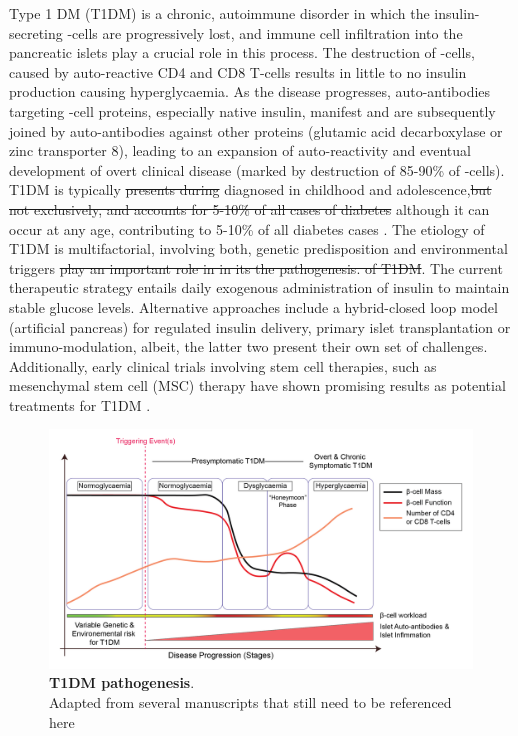Type 1 DM (T1DM) is a chronic, autoimmune disorder in which the insulin-secreting \textbeta-cells are progressively lost, and immune cell infiltration into the pancreatic islets play a crucial role in this process. The destruction of \textbeta-cells, caused by auto-reactive CD4 and CD8 T-cells results in little to no insulin production causing hyperglycaemia. As the disease progresses, auto-antibodies targeting \textbeta-cell proteins, especially native insulin, manifest and are subsequently joined by auto-antibodies against other proteins (glutamic acid decarboxylase or zinc transporter 8), leading to an expansion of auto-reactivity and eventual development of overt clinical disease (marked by destruction of 85-90\% of \textbeta-cells).
\newpage
T1DM is typically \st{presents during} diagnosed in childhood and adolescence,\st{but not exclusively, and accounts for 5-10\% of all cases of diabetes} although it can occur at any age, contributing to 5-10\% of all diabetes cases \textbf{\cite{banday_pathophysiology_2020}}. The etiology of T1DM is multifactorial, involving both, genetic predisposition and environmental triggers \st{play an important role in in its the pathogenesis. of T1DM}. The current therapeutic strategy entails daily exogenous administration of insulin to maintain stable glucose levels. Alternative approaches include a hybrid-closed loop model (artificial pancreas) for regulated insulin delivery, primary islet transplantation or immuno-modulation, albeit, the latter two present their own set of challenges. Additionally, early clinical trials involving stem cell therapies, such as mesenchymal stem cell (MSC) therapy have shown promising results as potential treatments for T1DM \textbf{\cite{pathak_therapies_2019}}.

\begin{figure}[t]
\centering
\includegraphics[width=16cm]{Chapter1/Fig/F1-3-02.png}
\caption[diabetes]{\textbf{T1DM pathogenesis}.\\
Adapted from several manuscripts that still need to be referenced here \textbf{\cite{chen_human_2017,von_herrath_type_2007,powers_type_2021}}}
\end{figure}


